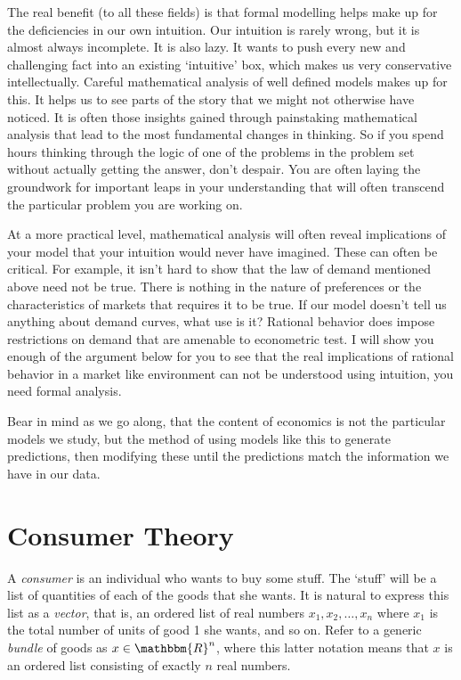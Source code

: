 \documentclass[12pt]{article}
\newcommand{\tmem}[1]{\textit{#1}}
\begin{document}
The real benefit (to all these fields) is that formal modelling helps make up
for the deficiencies in our own intuition. Our intuition is rarely wrong, but
it is almost always incomplete. It is also lazy. It wants to push every new
and challenging fact into an existing `intuitive' box, which makes us very
conservative intellectually. Careful mathematical analysis of well defined
models makes up for this. It helps us to see parts of the story that we might
not otherwise have noticed. It is often those insights gained through
painstaking mathematical analysis that lead to the most fundamental changes in
thinking. So if you spend hours thinking through the logic of one of the problems in
the problem set without actually getting the answer, don't despair. You are
often laying the groundwork for important leaps in your understanding that
will often transcend the particular problem you are working on.

At a more practical level, mathematical analysis will often reveal
implications of your model that your intuition would never have imagined.
These can often be critical. For example, it isn't hard to show that the law
of demand mentioned above need not be true. There is nothing in the nature of
preferences or the characteristics of markets that requires it to be true. If
our model doesn't tell us anything about demand curves, what use is it?
Rational behavior does impose restrictions on demand that are amenable to
econometric test. I will show you enough of the argument below for you to see
that the real implications of rational behavior in a market like environment
can not be understood using intuition, you need formal analysis.

Bear in mind as we go along, that the content of economics is not the
particular models we study, but the method of using models like this to
generate predictions, then modifying these until the predictions match the
information we have in our data.

\section{Consumer Theory}

A {\tmem{consumer}} is an individual who wants to buy some stuff. The `stuff'
will be a list of quantities of each of the goods that she wants. It is
natural to express this list as a {\tmem{vector}}, that is, an ordered list of
real numbers $x_1, x_2, \ldots, x_n$ where $x_1$ is the total number of units
of good 1 she wants, and so on. Refer to a generic {\tmem{bundle}} of goods as
$x \in \mathbbm{R}^n$, where this latter notation means that $x$ is an ordered
list consisting of exactly $n$ real numbers.
\end{document}
